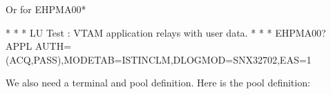 \documentclass[letterpaper,10pt,english]{sphinxmanual}
\begin{document}
Or for EHPMA00*

\begin{sphinxVerbatim}[commandchars=\\\{\}]
* \PYGZhy{}\PYGZhy{}\PYGZhy{}\PYGZhy{}\PYGZhy{}\PYGZhy{}\PYGZhy{}\PYGZhy{}\PYGZhy{}\PYGZhy{}\PYGZhy{}\PYGZhy{}\PYGZhy{}\PYGZhy{}\PYGZhy{}\PYGZhy{}\PYGZhy{}\PYGZhy{}\PYGZhy{}\PYGZhy{}\PYGZhy{}\PYGZhy{}\PYGZhy{}\PYGZhy{}\PYGZhy{}\PYGZhy{}\PYGZhy{}\PYGZhy{}\PYGZhy{}\PYGZhy{}\PYGZhy{}\PYGZhy{}\PYGZhy{}\PYGZhy{}\PYGZhy{}\PYGZhy{}\PYGZhy{}\PYGZhy{}\PYGZhy{}\PYGZhy{}\PYGZhy{}\PYGZhy{}\PYGZhy{}\PYGZhy{}\PYGZhy{}\PYGZhy{}\PYGZhy{}\PYGZhy{}\PYGZhy{}\PYGZhy{}\PYGZhy{}\PYGZhy{}\PYGZhy{}\PYGZhy{}\PYGZhy{}\PYGZhy{}\PYGZhy{}\PYGZhy{}\PYGZhy{}\PYGZhy{}\PYGZhy{}\PYGZhy{}\PYGZhy{}\PYGZhy{}\PYGZhy{}\PYGZhy{} *
* LU Test : VTAM application relays with user data. *
* \PYGZhy{}\PYGZhy{}\PYGZhy{}\PYGZhy{}\PYGZhy{}\PYGZhy{}\PYGZhy{}\PYGZhy{}\PYGZhy{}\PYGZhy{}\PYGZhy{}\PYGZhy{}\PYGZhy{}\PYGZhy{}\PYGZhy{}\PYGZhy{}\PYGZhy{}\PYGZhy{}\PYGZhy{}\PYGZhy{}\PYGZhy{}\PYGZhy{}\PYGZhy{}\PYGZhy{}\PYGZhy{}\PYGZhy{}\PYGZhy{}\PYGZhy{}\PYGZhy{}\PYGZhy{}\PYGZhy{}\PYGZhy{}\PYGZhy{}\PYGZhy{}\PYGZhy{}\PYGZhy{}\PYGZhy{}\PYGZhy{}\PYGZhy{}\PYGZhy{}\PYGZhy{}\PYGZhy{}\PYGZhy{}\PYGZhy{}\PYGZhy{}\PYGZhy{}\PYGZhy{}\PYGZhy{}\PYGZhy{}\PYGZhy{}\PYGZhy{}\PYGZhy{}\PYGZhy{}\PYGZhy{}\PYGZhy{}\PYGZhy{}\PYGZhy{}\PYGZhy{}\PYGZhy{}\PYGZhy{}\PYGZhy{}\PYGZhy{}\PYGZhy{}\PYGZhy{}\PYGZhy{}\PYGZhy{} *
EHPMA00? APPL AUTH=(ACQ,PASS),MODETAB=ISTINCLM,DLOGMOD=SNX32702,EAS=1
\end{sphinxVerbatim}


We also need a terminal and pool definition. Here is the pool definition:

\begin{sphinxVerbatim}[commandchars=\\\{\}]
  
     
 
 
 
 
 
 
\end{sphinxVerbatim}
\end{document}
